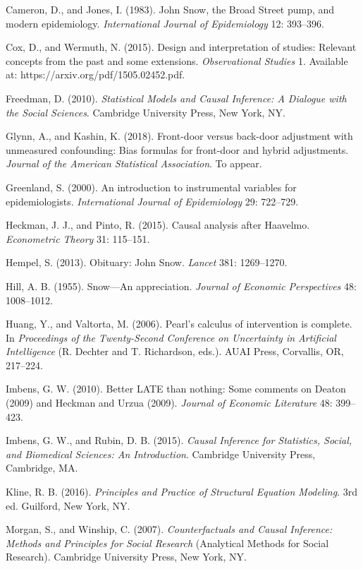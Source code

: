 \documentclass[11pt,a5paper,twoside]{book}
\begin{document}
Cameron, D., and Jones, I. (1983). John Snow, the Broad Street pump, and modern epidemiology. \textit{International Journal of Epidemiology} 12: 393–396.

Cox, D., and Wermuth, N. (2015). Design and interpretation of studies: Relevant concepts from the past and some extensions. \textit{Observational Studies} 1. Available at: https://arxiv.org/pdf/1505.02452.pdf.

Freedman, D. (2010). \textit{Statistical Models and Causal Inference: A Dialogue with the Social Sciences}. Cambridge University Press, New York, NY.

Glynn, A., and Kashin, K. (2018). Front-door versus back-door adjustment with unmeasured confounding: Bias formulas for front-door and hybrid adjustments. \textit{Journal of the American Statistical Association}. To appear.

Greenland, S. (2000). An introduction to instrumental variables for epidemiologists. \textit{International Journal of Epidemiology} 29: 722–729.

Heckman, J. J., and Pinto, R. (2015). Causal analysis after Haavelmo. \textit{Econometric Theory} 31: 115–151.

Hempel, S. (2013). Obituary: John Snow. \textit{Lancet} 381: 1269–1270.

Hill, A. B. (1955). Snow—An appreciation. \textit{Journal of Economic Perspectives} 48: 1008–1012.

Huang, Y., and Valtorta, M. (2006). Pearl’s calculus of intervention is complete. In \textit{Proceedings of the Twenty-Second Conference on Uncertainty in Artificial Intelligence} (R. Dechter and T. Richardson, eds.). AUAI Press, Corvallis, OR, 217–224.

Imbens, G. W. (2010). Better LATE than nothing: Some comments on Deaton (2009) and Heckman and Urzua (2009). \textit{Journal of Economic Literature} 48: 399–423.

Imbens, G. W., and Rubin, D. B. (2015). \textit{Causal Inference for Statistics, Social, and Biomedical Sciences: An Introduction}. Cambridge University Press, Cambridge, MA.

Kline, R. B. (2016). \textit{Principles and Practice of Structural Equation Modeling}. 3rd ed. Guilford, New York, NY.

Morgan, S., and Winship, C. (2007). \textit{Counterfactuals and Causal Inference: Methods and Principles for Social Research} (Analytical Methods for Social Research). Cambridge University Press, New York, NY.
\end{document}
